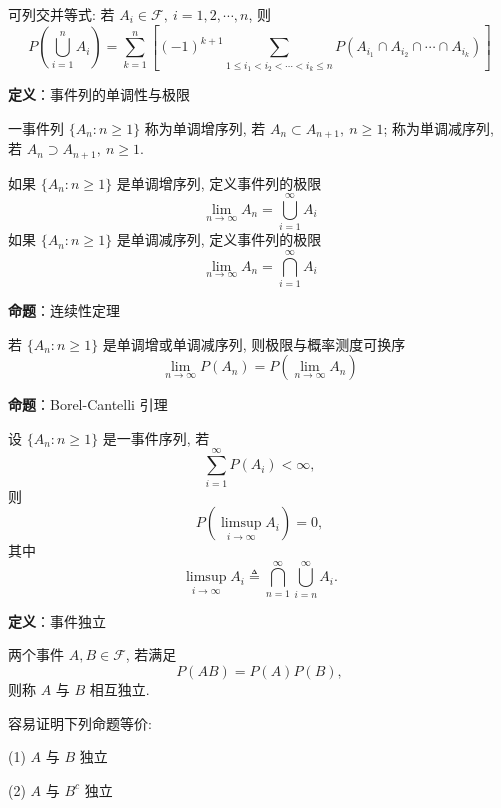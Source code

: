 \documentclass[openany]{ctexbook}
\theoremstyle{kaiti}
\theoremstyle{normal}
\begin{document}
可列交并等式: 若 $A_i\in\mathcal{F},~i=1,2,\cdots,n$, 则
\begin{equation}
  P\left(\bigcup_{i=1}^n A_i\right)=\sum_{k=1}^n\left[ (-1)^{k+1}\sum_{1\leqslant i_1<i_2<\cdots<i_k\leqslant n}P\left(A_{i_1}\cap A_{i_2}\cap\cdots\cap A_{i_k}\right)\right]
\end{equation}


\textbf{定义}：事件列的单调性与极限

一事件列 $\{A_n:n\geqslant1\}$ 称为单调增序列, 若 $A_n\subset A_{n+1},~n\geqslant1$; 称为単调减序列, 若 $A_n\supset A_{n+1},~n\geqslant1$. 

如果 $\{A_n:n\geqslant1\}$ 是单调增序列, 定义事件列的极限
\begin{equation}
  \lim_{n\to\infty}A_n=\bigcup_{i=1}^\infty A_i
\end{equation}
 如果 $\{A_n:n\geqslant1\}$ 是单调减序列, 定义事件列的极限
\begin{equation}
  \lim_{n\to\infty}A_n=\bigcap_{i=1}^\infty A_i
\end{equation}


\textbf{命题}：连续性定理

若 $\{A_n:n\geqslant1\}$ 是单调增或单调减序列, 则极限与概率测度可换序
\begin{equation}
  \lim_{n\to\infty}P(A_n)=P\left(\lim_{n\to\infty}A_n\right)
\end{equation}


\textbf{命题}：Borel-Cantelli 引理

设 $\{A_n:n\geqslant1\}$ 是一事件序列, 若
\begin{equation}
  \sum_{i=1}^\infty P(A_i)<\infty,
\end{equation}
 则
\begin{equation}
  P\left(\limsup_{i\to\infty}A_i\right)=0,
\end{equation}
 其中
\begin{equation}
  \limsup_{i\to\infty}A_i\triangleq\bigcap_{n=1}^\infty\bigcup_{i=n}^\infty A_i.
\end{equation}


\textbf{定义}：事件独立

两个事件 $A,B\in\mathcal{F}$, 若满足
\begin{equation}
  P(AB)=P(A)P(B),
\end{equation}
 则称 $A$ 与 $B$ 相互独立. 

容易证明下列命题等价:

(1) $A$ 与 $B$ 独立

(2) $A$ 与 $B^c$ 独立
\end{document}
